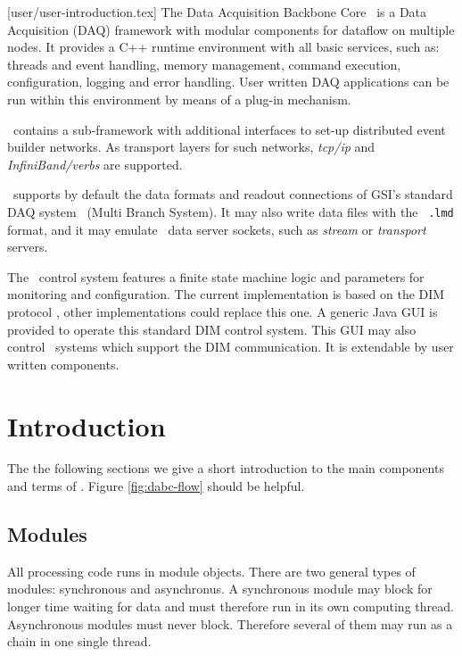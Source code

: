 [user/user-introduction.tex]
\label{user-introduction}
The Data Acquisition Backbone Core \dabc\ is a
Data Acquisition (DAQ) framework with modular components for dataflow on multiple nodes.
It provides a C++ runtime environment with all basic services, such as:
threads and event handling, memory management, command execution, 
configuration, logging and error handling.
User written DAQ applications can be run within this environment by
means of a plug-in mechanism.

\dabc\ contains a sub-framework with additional interfaces 
to set-up distributed event builder networks. As transport layers for such
networks, {\em tcp/ip} and {\em InfiniBand/verbs} are supported.

\dabc\ supports by default the data formats and readout connections of GSI's standard DAQ system \mbs\ (Multi Branch System). It may also write data files with the 
\mbs\ {\tt *.lmd} format, and it may emulate \mbs\ data server sockets, such as
{\em stream} or {\em transport} servers.

The \dabc\ control system features a finite state machine
logic and parameters for monitoring and  configuration.  The current implementation is based
on the DIM protocol \cite{DIM}, other implementations could replace this one.
A generic Java GUI is provided to operate this standard DIM control system.
This GUI may also control \mbs\ systems which support the DIM communication.
It is extendable by user written components. 

\section{Introduction}
The the following sections we give a short introduction to the
main components and terms of \dabc. 
Figure \ref{fig:dabc-flow} should be helpful.

\subsection{Modules}
All processing code runs in module objects. 
There are two general types of modules: synchronous and asynchronus.
A synchronous module may block for longer time waiting for data
and must therefore run in its own computing thread.
Asynchronous modules must never block. Therefore several of them
may run as a chain in one single thread.

